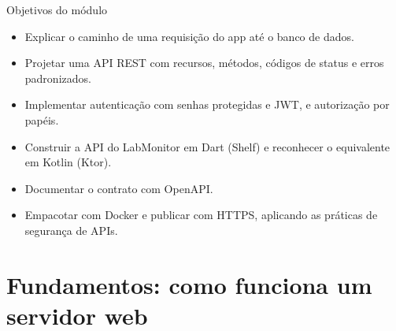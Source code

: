 \documentclass[aspectratio=169,10pt]{beamer}
\begin{document}
\capa

\begin{frame}{Objetivos do módulo}
  \begin{conceito}
    \begin{itemize}
      \item Explicar o caminho de uma requisição do app até o banco de dados.
      \item Projetar uma API REST com recursos, métodos, códigos de status e erros padronizados.
      \item Implementar autenticação com senhas protegidas e JWT, e autorização por papéis.
      \item Construir a API do LabMonitor em Dart (Shelf) e reconhecer o equivalente em Kotlin (Ktor).
      \item Documentar o contrato com OpenAPI.
      \item Empacotar com Docker e publicar com HTTPS, aplicando as práticas de segurança de APIs.
    \end{itemize}
  \end{conceito}
\end{frame}

\sumario

\section{Fundamentos: como funciona um servidor web}
\end{document}
